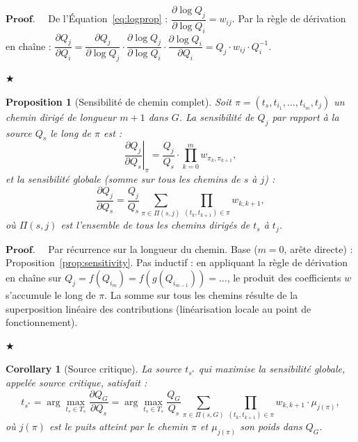 \documentclass[12pt]{article}
\newtheorem{proposition}{Proposition}[section]
\newtheorem{corollary}[theorem]{Corollary}
\newenvironment{proof}{$\mathbf{Proof.\quad}$}{\begin{flushright}$\bigstar$\end{flushright}}
\begin{document}
\begin{proof}
	De l’Équation~\eqref{eq:logprop} :
	$\dfrac{\partial \log Q_j}{\partial \log Q_i} = w_{ij}$.
	Par la règle de dérivation en chaîne :
	$\dfrac{\partial Q_j}{\partial Q_i}
	= \dfrac{\partial Q_j}{\partial \log Q_j}
	\cdot \dfrac{\partial \log Q_j}{\partial \log Q_i}
	\cdot \dfrac{\partial \log Q_i}{\partial Q_i}
	= Q_j \cdot w_{ij} \cdot Q_i^{-1}$.
\end{proof}

\begin{proposition}[Sensibilité de chemin complet]
	\label{prop:path_sensitivity}
	Soit $\pi = (t_{s}, t_{i_1}, \ldots, t_{i_m}, t_j)$ un chemin dirigé
	de longueur $m+1$ dans $G$. La sensibilité de $Q_j$ par rapport
	à la source $Q_s$ le long de $\pi$ est :
	\begin{equation}
		\left.\frac{\partial Q_j}{\partial Q_s}\right|_\pi
		= \frac{Q_j}{Q_s}
		\cdot \prod_{k=0}^{m} w_{\pi_k, \pi_{k+1}},
		\label{eq:sens_path}
	\end{equation}
	et la sensibilité globale (somme sur tous les chemins de $s$ à $j$) :
	\begin{equation}
		\frac{\partial Q_j}{\partial Q_s}
		= \frac{Q_j}{Q_s}
		\sum_{\pi \in \Pi(s,j)}
		\prod_{(t_k,t_{k+1})\in\pi} w_{k,k+1},
		\label{eq:sens_global}
	\end{equation}
	où $\Pi(s,j)$ est l'ensemble de tous les chemins dirigés de $t_s$ à $t_j$.
\end{proposition}

\begin{proof}
	Par récurrence sur la longueur du chemin.
	Base ($m=0$, arête directe) : Proposition~\ref{prop:sensitivity}.
	Pas inductif : en appliquant la règle de dérivation en chaîne sur
	$Q_j = f(Q_{i_m}) = f(g(Q_{i_{m-1}})) = \ldots$, le produit des
	coefficients $w$ s'accumule le long de $\pi$.
	La somme sur tous les chemins résulte de la superposition linéaire
	des contributions (linéarisation locale au point de fonctionnement).
\end{proof}

\begin{corollary}[Source critique]
	\label{cor:critical_source}
	La source $t_{s^*}$ qui maximise la sensibilité globale, appelée
	\emph{source critique}, satisfait :
	\begin{equation}
		t_{s^*} = \arg\max_{t_s \in T_s}
		\frac{\partial Q_G}{\partial Q_s}
		= \arg\max_{t_s \in T_s}
		\frac{Q_G}{Q_s}
		\sum_{\pi \in \Pi(s,G)} \prod_{(t_k,t_{k+1})\in\pi} w_{k,k+1} \cdot \mu_{j(\pi)},
		\label{eq:critical}
	\end{equation}
	où $j(\pi)$ est le puits atteint par le chemin $\pi$ et $\mu_{j(\pi)}$
	son poids dans $Q_G$.
\end{corollary}
\end{document}

